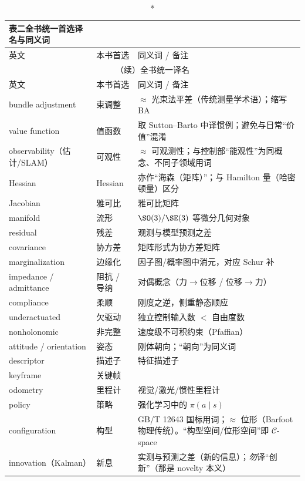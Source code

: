 \begin{center}\small
\begin{longtable}{p{} p{} p{}}
\caption*{\textbf{表二}\quad 全书统一首选译名与同义词}\\
\toprule
英文 & 本书首选 & 同义词 / 备注 \\
\midrule
\endfirsthead
\multicolumn{3}{c}{\small（续）全书统一译名}\\
\toprule
英文 & 本书首选 & 同义词 / 备注 \\
\midrule
\endhead
\bottomrule
\endfoot
bundle adjustment & 束调整 & $\approx$ 光束法平差（传统测量学术语）；缩写 BA \\
value function & 值函数 & 取 Sutton--Barto 中译惯例；避免与日常“价值”混淆 \\
observability（估计/SLAM） & 可观性 & $\approx$ 可观测性；与控制部“能观性”为同概念、不同子领域用词 \\
Hessian & Hessian & 亦作“海森（矩阵）”；与 Hamilton 量（哈密顿量）区分 \\
Jacobian & 雅可比 & 雅可比矩阵 \\
manifold & 流形 & $\SO(3)/\SE(3)$ 等微分几何对象 \\
residual & 残差 & 观测与模型预测之差 \\
covariance & 协方差 & 矩阵形式为协方差矩阵 \\
marginalization & 边缘化 & 因子图/概率图中消元，对应 Schur 补 \\
impedance / admittance & 阻抗 / 导纳 & 对偶概念（力$\to$位移 / 位移$\to$力）\\
compliance & 柔顺 & 刚度之逆，侧重静态顺应 \\
underactuated & 欠驱动 & 独立控制输入数 $<$ 自由度数 \\
nonholonomic & 非完整 & 速度级不可积约束（Pfaffian）\\
attitude / orientation & 姿态 & 刚体朝向；“朝向”为同义词 \\
descriptor & 描述子 & 特征描述子 \\
keyframe & 关键帧 & \\
odometry & 里程计 & 视觉/激光/惯性里程计 \\
policy & 策略 & 强化学习中的 $\pi(a\mid s)$ \\
configuration & 构型 & GB/T 12643 国标用词；$\approx$ 位形（Barfoot 物理传统）。“构型空间/位形空间”即 $\mathcal{C}$-space \\
innovation（Kalman） & 新息 & 实测与预测之差（新的信息）；\emph{勿}译“创新”（那是 novelty 本义）\\

\end{longtable}
\end{center}
